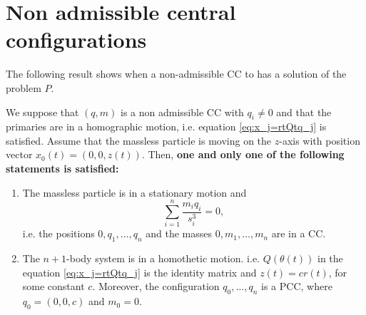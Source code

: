 \documentclass[smallcondensed]{svjour3}
\begin{document}
\section{Non admissible central configurations}

The following result shows when a non-admissible CC to has  a solution of the problem $P$.

\begin{theorem}\label{thm:no.admisible.movimiento}

We suppose that $(q,m)$ is a non admissible   CC with $q_i\neq 0$ and that the primaries are in a homographic motion, i.e.  equation \eqref{eq:x_j=rtQtq_j} is satisfied. Assume that the massless particle is moving on the $z$-axis with position vector $x_0(t)=(0,0,z(t))$. Then, \textbf{one and only one of the following statements is satisfied:}

\begin{enumerate}
 \item\label{it:z==0} The massless particle is in a stationary motion and
 \begin{equation}\label{eq:acel.centrmasa=0}
  \sum_{i=1}^{n}\frac{m_iq_i}{s_i^3}=0,
 \end{equation}
 i.e. the positions $0,q_1,\ldots,q_n$ and the masses $0,m_1,\ldots,m_n$ are in a CC.
 \item\label{it:z=r} The $n+1$-body system is in a homothetic motion. i.e. $Q(\theta(t))$ in the equation \eqref{eq:x_j=rtQtq_j} is the identity matrix and $z(t)=cr(t)$, for some constant $c$. Moreover, the configuration $q_0,\ldots,q_n$ is a PCC, where $q_0=(0,0,c)$ and $m_0=0$.
\end{enumerate}
\end{theorem}
\end{document}
